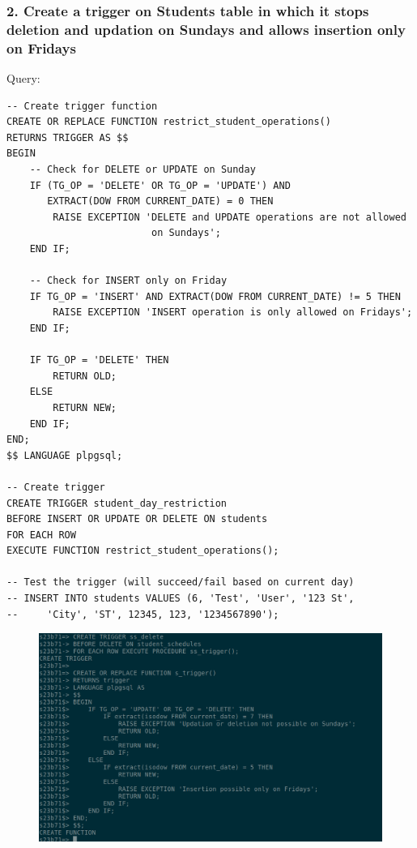\documentclass{article}
\begin{document}
\subsubsection*{2. Create a trigger on Students table in which it stops deletion and updation on Sundays and allows insertion only on Fridays}
Query:
\begin{Verbatim}[frame=single,framerule=1pt,fontfamily=courier,fontsize=\small]
-- Create trigger function
CREATE OR REPLACE FUNCTION restrict_student_operations()
RETURNS TRIGGER AS $$
BEGIN
    -- Check for DELETE or UPDATE on Sunday
    IF (TG_OP = 'DELETE' OR TG_OP = 'UPDATE') AND 
       EXTRACT(DOW FROM CURRENT_DATE) = 0 THEN
        RAISE EXCEPTION 'DELETE and UPDATE operations are not allowed 
                         on Sundays';
    END IF;
    
    -- Check for INSERT only on Friday
    IF TG_OP = 'INSERT' AND EXTRACT(DOW FROM CURRENT_DATE) != 5 THEN
        RAISE EXCEPTION 'INSERT operation is only allowed on Fridays';
    END IF;
    
    IF TG_OP = 'DELETE' THEN
        RETURN OLD;
    ELSE
        RETURN NEW;
    END IF;
END;
$$ LANGUAGE plpgsql;

-- Create trigger
CREATE TRIGGER student_day_restriction
BEFORE INSERT OR UPDATE OR DELETE ON students
FOR EACH ROW
EXECUTE FUNCTION restrict_student_operations();

-- Test the trigger (will succeed/fail based on current day)
-- INSERT INTO students VALUES (6, 'Test', 'User', '123 St', 
--     'City', 'ST', 12345, 123, '1234567890');
\end{Verbatim}
\begin{figure}[H]
    \centering
    \includegraphics[width=\textwidth]{cycle6/6-2.png}
\end{figure}
\end{document}
